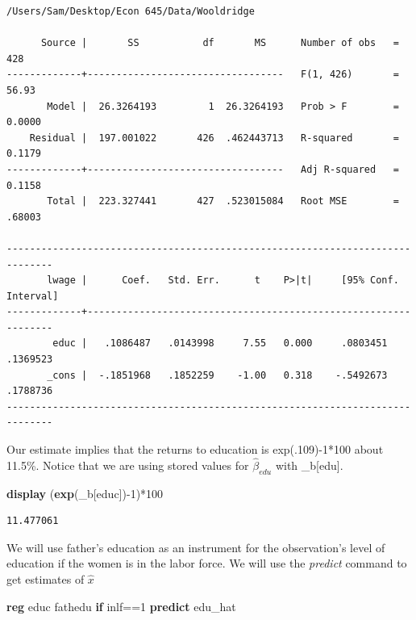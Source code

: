 \documentclass[
]{book}
\newenvironment{Shaded}{\begin{snugshade}}{\end{snugshade}}
\newcommand{\FunctionTok}[1]{\textcolor[rgb]{0.13,0.29,0.53}{\textbf{#1}}}
\newcommand{\KeywordTok}[1]{\textcolor[rgb]{0.13,0.29,0.53}{\textbf{#1}}}
\newcommand{\NormalTok}[1]{#1}
\begin{document}
\begin{verbatim}
/Users/Sam/Desktop/Econ 645/Data/Wooldridge

      Source |       SS           df       MS      Number of obs   =       428
-------------+----------------------------------   F(1, 426)       =     56.93
       Model |  26.3264193         1  26.3264193   Prob > F        =    0.0000
    Residual |  197.001022       426  .462443713   R-squared       =    0.1179
-------------+----------------------------------   Adj R-squared   =    0.1158
       Total |  223.327441       427  .523015084   Root MSE        =    .68003

------------------------------------------------------------------------------
       lwage |      Coef.   Std. Err.      t    P>|t|     [95% Conf. Interval]
-------------+----------------------------------------------------------------
        educ |   .1086487   .0143998     7.55   0.000     .0803451    .1369523
       _cons |  -.1851968   .1852259    -1.00   0.318    -.5492673    .1788736
------------------------------------------------------------------------------
\end{verbatim}

Our estimate implies that the returns to education is exp(.109)-1*100 about 11.5\%. Notice that we are using stored values for \(\hat{\beta}_{edu}\) with \_b{[}edu{]}.

\begin{Shaded}
\begin{Highlighting}[]
\KeywordTok{display}\NormalTok{ (}\FunctionTok{exp}\NormalTok{(\_b[educ]){-}1)*100}
\end{Highlighting}
\end{Shaded}

\begin{verbatim}
11.477061
\end{verbatim}

We will use father's education as an instrument for the observation's level of education if the women is in the labor force. We will use the \emph{predict} command to get estimates of \(\hat{x}\)

\begin{Shaded}
\begin{Highlighting}[]
\KeywordTok{reg}\NormalTok{ educ fathedu }\KeywordTok{if}\NormalTok{ inlf==1}
\KeywordTok{predict}\NormalTok{ edu\_hat}
\end{Highlighting}
\end{Shaded}
\end{document}
